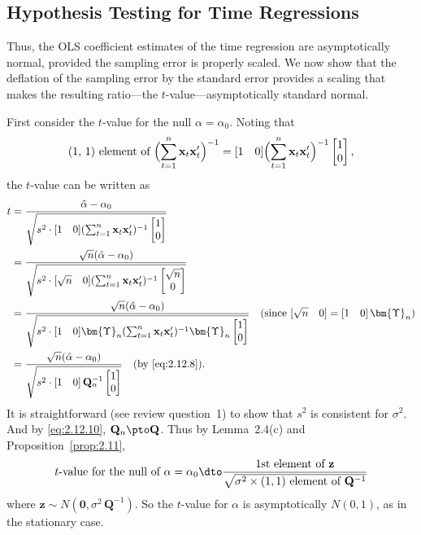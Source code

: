 \subsection*{Hypothesis Testing for Time Regressions}

Thus, the OLS coefficient estimates of the time regression are asymptotically normal, provided the sampling error is properly scaled. We now show that the deflation of the sampling error by the standard error provides a scaling that makes the
resulting ratio---the $t$-value---asymptotically standard normal.

First consider the $t$-value for the null $\alpha = \alpha_0$. Noting that
%
\begin{equation}
\text{(1, 1) element of }
\Bigl(\sum_{t=1}^{n}\mathbf{x}_t\mathbf{x}_t'\Bigr)^{-1}
= [1 \quad 0]\Bigl(\sum_{t=1}^{n}\mathbf{x}_t\mathbf{x}_t'\Bigr)^{-1}
\begin{bmatrix} 1 \\ 0 \end{bmatrix},
\label{eq:2.12.12}
\end{equation}
%
the $t$-value can be written as
%
\begin{align}
t &= \frac{\hat{\alpha} - \alpha_0}
{\sqrt{s^2 \cdot [1 \quad 0]
(\sum_{t=1}^{n}\mathbf{x}_t\mathbf{x}_t')^{-1}
\begin{bmatrix} 1 \\ 0 \end{bmatrix}}} \notag \\
&= \frac{\sqrt{n}(\hat{\alpha} - \alpha_0)}
{\sqrt{s^2 \cdot [\sqrt{n} \quad 0]
(\sum_{t=1}^{n}\mathbf{x}_t\mathbf{x}_t')^{-1}
\begin{bmatrix} \sqrt{n} \\ 0 \end{bmatrix}}} \notag \\
&= \frac{\sqrt{n}(\hat{\alpha} - \alpha_0)}
{\sqrt{s^2 \cdot [1 \quad 0]
\bm{\Upsilon}_n
(\sum_{t=1}^{n}\mathbf{x}_t\mathbf{x}_t')^{-1}
\bm{\Upsilon}_n
\begin{bmatrix} 1 \\ 0 \end{bmatrix}}}
\quad (\text{since } [\sqrt{n} \quad 0] = [1 \quad 0]\,\bm{\Upsilon}_n)
\notag \\
&= \frac{\sqrt{n}(\hat{\alpha} - \alpha_0)}
{\sqrt{s^2 \cdot [1 \quad 0]\,\mathbf{Q}_n^{-1}
\begin{bmatrix} 1 \\ 0 \end{bmatrix}}}
\quad \text{(by \eqref{eq:2.12.8})}.
\label{eq:2.12.13}
\end{align}
%
It is straightforward (see review question~1) to show that $s^2$ is consistent for $\sigma^2$.
And by \eqref{eq:2.12.10}, $\mathbf{Q}_n \pto \mathbf{Q}$. Thus by Lemma~2.4(c) and Proposition~\ref{prop:2.11},
%
\begin{equation}
t\text{-value for the null of } \alpha = \alpha_0 \dto
\frac{\text{1st element of } \mathbf{z}}
{\sqrt{\sigma^2 \times (1,1) \text{ element of } \mathbf{Q}^{-1}}}
\label{eq:2.12.14}
\end{equation}
%
where $\mathbf{z} \sim N(\mathbf{0}, \sigma^2\,\mathbf{Q}^{-1})$. So the $t$-value for $\alpha$ is asymptotically $N(0, 1)$, as in the
stationary case.

